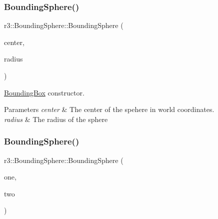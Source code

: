 \mbox{\label{classr3_1_1_bounding_sphere_a9a9264c19d56b10c9b0def547a369d57}} 
\subsubsection{\texorpdfstring{Bounding\+Sphere()}{BoundingSphere()}\hspace{0.1cm}{\footnotesize\ttfamily [2/3]}}
{\footnotesize\ttfamily r3\+::\+Bounding\+Sphere\+::\+Bounding\+Sphere (\begin{DoxyParamCaption}\item[{const glm\+::vec3 \&}]{center,  }\item[{\mbox{\hyperlink{namespacer3_ab2016b3e3f743fb735afce242f0dc1eb}{real}}}]{radius }\end{DoxyParamCaption})}



\mbox{\hyperlink{classr3_1_1_bounding_box}{Bounding\+Box}} constructor. 


\begin{DoxyParams}{Parameters}
{\em center} & The center of the spehere in world coordinates. \\
\hline
{\em radius} & The radius of the sphere \\
\hline
\end{DoxyParams}
\mbox{\label{classr3_1_1_bounding_sphere_a3d461e62b827ad9a30ca8013d451e3da}} 
\subsubsection{\texorpdfstring{Bounding\+Sphere()}{BoundingSphere()}\hspace{0.1cm}{\footnotesize\ttfamily [3/3]}}
{\footnotesize\ttfamily r3\+::\+Bounding\+Sphere\+::\+Bounding\+Sphere (\begin{DoxyParamCaption}\item[{const \mbox{\hyperlink{classr3_1_1_bounding_sphere}{Bounding\+Sphere}} \&}]{one,  }\item[{const \mbox{\hyperlink{classr3_1_1_bounding_sphere}{Bounding\+Sphere}} \&}]{two }\end{DoxyParamCaption})}



